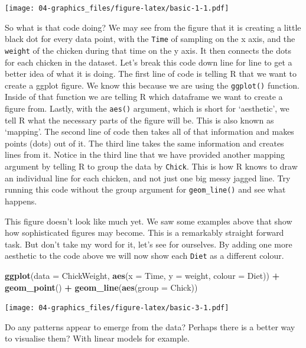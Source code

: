 \documentclass[]{book}
\newenvironment{Shaded}{\begin{snugshade}}{\end{snugshade}}
\newcommand{\KeywordTok}[1]{\textcolor[rgb]{0.13,0.29,0.53}{\textbf{#1}}}
\newcommand{\DataTypeTok}[1]{\textcolor[rgb]{0.13,0.29,0.53}{#1}}
\newcommand{\StringTok}[1]{\textcolor[rgb]{0.31,0.60,0.02}{#1}}
\newcommand{\OperatorTok}[1]{\textcolor[rgb]{0.81,0.36,0.00}{\textbf{#1}}}
\newcommand{\NormalTok}[1]{#1}
\theoremstyle{definition}
\theoremstyle{definition}
\theoremstyle{definition}
\theoremstyle{remark}
\begin{document}
\texttt{[image: 04-graphics\_files/figure-latex/basic-1-1.pdf]}

So what is that code doing? We may see from the figure that it is
creating a little black dot for every data point, with the \texttt{Time}
of sampling on the x axis, and the \texttt{weight} of the chicken during
that time on the y axis. It then connects the dots for each chicken in
the dataset. Let's break this code down line for line to get a better
idea of what it is doing. The first line of code is telling R that we
want to create a ggplot figure. We know this because we are using the
\texttt{ggplot()} function. Inside of that function we are telling R
which dataframe we want to create a figure from. Lastly, with the
\texttt{aes()} argument, which is short for `aesthetic', we tell R what
the necessary parts of the figure will be. This is also known as
`mapping'. The second line of code then takes all of that information
and makes points (dots) out of it. The third line takes the same
information and creates lines from it. Notice in the third line that we
have provided another mapping argument by telling R to group the data by
\texttt{Chick}. This is how R knows to draw an individual line for each
chicken, and not just one big messy jagged line. Try running this code
without the group argument for \texttt{geom\_line()} and see what
happens.

This figure doesn't look like much yet. We saw some examples above that
show how sophisticated figures may become. This is a remarkably straight
forward task. But don't take my word for it, let's see for ourselves. By
adding one more aesthetic to the code above we will now show each
\texttt{Diet} as a different colour.

\begin{Shaded}
\begin{Highlighting}[]
\KeywordTok{ggplot}\NormalTok{(}\DataTypeTok{data =}\NormalTok{ ChickWeight, }\KeywordTok{aes}\NormalTok{(}\DataTypeTok{x =}\NormalTok{ Time, }\DataTypeTok{y =}\NormalTok{ weight, }\DataTypeTok{colour =}\NormalTok{ Diet)) }\OperatorTok{+}
\StringTok{  }\KeywordTok{geom_point}\NormalTok{() }\OperatorTok{+}
\StringTok{  }\KeywordTok{geom_line}\NormalTok{(}\KeywordTok{aes}\NormalTok{(}\DataTypeTok{group =}\NormalTok{ Chick))}
\end{Highlighting}
\end{Shaded}

\texttt{[image: 04-graphics\_files/figure-latex/basic-3-1.pdf]}

Do any patterns appear to emerge from the data? Perhaps there is a
better way to visualise them? With linear models for example.
\end{document}
